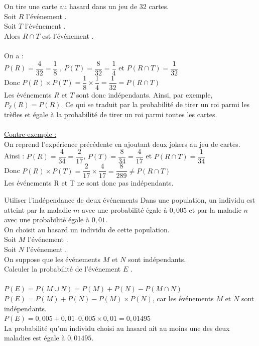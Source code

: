 \begin{exemple}
	On tire une carte au hasard dans un jeu de 32 cartes.\\
	Soit $R$ l'événement .\\
	Soit $T$ l'événement .\\
	Alors $R\cap T$ est l'événement .\\
	\ \\
	On a :\\
	$P(R)  = \dfrac{4}{32} = \dfrac{1}{8}$ , $P(T)= \dfrac{8}{32} = \dfrac{1}{4}$ et $P(R\cap T)= \dfrac{1}{32}$\\ 
	Donc $P(R)\times P(T)  = \dfrac{1}{8} \times \dfrac{1}{4} = \dfrac{1}{32} = P(R\cap T)$\\
	Les événements $R$ et $T$ sont donc indépendants.
	Ainsi, par exemple, $P_T (R)=P(R)$. Ce qui se traduit par la probabilité de tirer un roi parmi les trèfles et égale à la probabilité de tirer un roi parmi toutes les cartes.\\
	\\
	\underline{Contre-exemple :}\\
	On reprend l'expérience précédente en ajoutant deux jokers au jeu de cartes.\\
	Ainsi :
	$P(R)  = \dfrac{4}{34} = \dfrac{2}{17}$, $P(T)= \dfrac{8}{34} = \dfrac{4}{17}$ et $P(R\cap T)= \dfrac{1}{34}$\\
	Donc $P(R)\times P(T)  = \dfrac{2}{17} \times \dfrac{4}{17} = \dfrac{8}{289} \neq P(R\cap T)$\\
	Les événements R et T ne sont donc pas indépendants.
\end{exemple}

\begin{methodeTitre}{Utiliser l'indépendance de deux événements}
	Dans une population, un individu est atteint par la maladie $m$ avec une probabilité égale à $0,005$ et par la maladie $n$ avec une probabilité égale à $0,01$.\\
	On choisit au hasard un individu de cette population.\\
	Soit $M$ l'événement .\\
	Soit $N$ l'événement .\\
	On suppose que les événements $M$ et $N$ sont indépendants.\\
	Calculer la probabilité de l'événement $E$ .\\
	\\
	$P(E)=P(M\cup N)=P(M)+P(N)-P(M\cap N)$\\
	$P(E)=P(M)+P(N)-P(M)\times P(N)$, car les événements $M$ et $N$ sont indépendants.\\
	$P(E)= 0,005 + 0,01 – 0,005 \times 0,01 = 0,01495$\\
	
	La probabilité qu'un individu choisi au hasard ait au moins une des deux maladies est égale à $0,01495$.\\
\end{methodeTitre}


